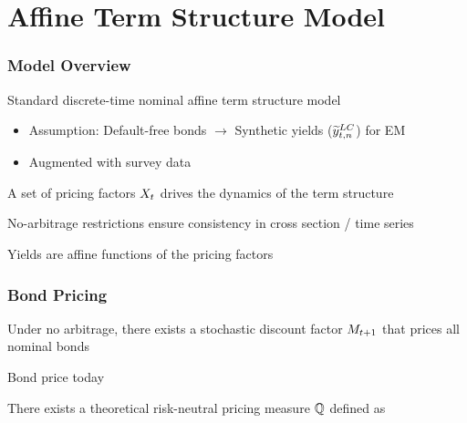 \documentclass[12pt, aspectratio=169, xcolor=dvipsnames]{beamer}
\begin{document}
\section{Affine Term Structure Model}

\begin{frame}[label=ATSM]
\frametitle{Model Overview}
	
	Standard discrete-time nominal affine term structure model
	\begin{itemize}
		\item Assumption: Default-free bonds \(\rightarrow\) \alert{Synthetic} yields (\(\widetilde{y}_{t,n} ^{LC}\)) for EM
		\item \alert{Augmented} with survey data
	\end{itemize}
	
	A set of pricing factors \(X_{t}\) drives the dynamics of the term structure
	
	No-arbitrage restrictions ensure consistency in cross section / time series %
	
	Yields are affine functions of the pricing factors
	
\end{frame}


\begin{frame}
\frametitle{Bond Pricing}
Under no arbitrage, there exists a stochastic discount factor \(M_{t+1}\) that prices all nominal bonds

Bond price today
	
	
There exists a theoretical risk-neutral pricing measure \(\mathbb{Q}\) defined as
	

\end{frame}
\end{document}

